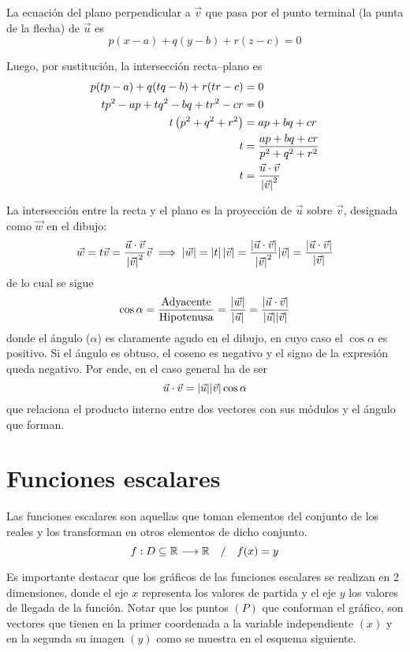 \documentclass[a5paper,12pt,twoside]{book}
\begin{document}
La ecuación del plano perpendicular a $\vec{v}$ que pasa por el punto terminal (la punta de la flecha) de $\vec{u}$ es
\[ p(x-a) + q(y-b) + r(z-c) = 0 \]

Luego, por sustitución, la intersección recta--plano es
\begin{align*}
    p(tp-a) + q(tq-b) + r(tr-c) &= 0
    \\
    tp^2 - ap + tq^2 - bq + tr^2 - cr &= 0
    \\
    t \left(p^2+q^2+r^2\right) &= ap + bq + cr
    \\
    t &= \frac{ap + bq + cr}{p^2+q^2+r^2}
    \\
    t &= \frac{\vec{u} \cdot \vec{v}}{{\left| {\vec{v}} \right|}^2}
\end{align*}

La intersección entre la recta y el plano es la proyección de $\vec{u}$ sobre $\vec{v}$, designada como $\vec{w}$ en el dibujo:
\[
  \vec{w} = t \vec{v} = \frac{\vec{u} \cdot \vec{v}}{{\left| {\vec{v}} \right|}^2} \vec{v}
  \implies
  {\left| {\vec{w}} \right|} = \left| t \right| {\left| {\vec{v}} \right|} = \frac{\left| \vec{u} \cdot \vec{v} \right|}{{\left| {\vec{v}} \right|}^2} {\left| {\vec{v}} \right|} = \frac{\left| \vec{u} \cdot \vec{v} \right|}{{\left| {\vec{v}} \right|}}
\]
de lo cual se sigue
\[ \cos \alpha = \frac{\text{Adyacente}}{\text{Hipotenusa}} = \frac{{\left| {\vec{w}} \right|}}{{\left| {\vec{u}} \right|}} = \frac{\left| \vec{u} \cdot \vec{v} \right|}{{\left| {\vec{u}} \right|}{\left| {\vec{v}} \right|}} \]
donde el ángulo ($\alpha$) es claramente agudo en el dibujo, en cuyo caso el $\cos\alpha$ es positivo.
Si el ángulo es obtuso, el coseno es negativo y el signo de la expresión queda negativo.
Por ende, en el caso general ha de ser
\[ \vec{u} \cdot \vec{v} = {\left| {\vec{u}} \right|} {\left| {\vec{v}} \right|} \cos \alpha \]
que relaciona el producto interno entre dos vectores con sus módulos y el ángulo que forman.


\section{Funciones escalares}
\label{sec:scalarFunctions}

Las funciones escalares son aquellas que toman elementos del conjunto de los reales y los transforman en otros elementos de dicho conjunto.
\[ f: D \subseteq \mathbb{R} \longrightarrow \mathbb{R} \quad / \quad f(x) = y \]

Es importante destacar que los gráficos de las funciones escalares se realizan en 2 dimensiones, donde el eje $x$ representa los valores de partida y el eje $y$ los valores de llegada de la función. Notar que los puntos $(P)$ que conforman el gráfico, son vectores que tienen en la primer coordenada a la variable independiente $(x)$ y en la segunda su imagen $(y)$ como se muestra en el esquema siguiente.
\end{document}
